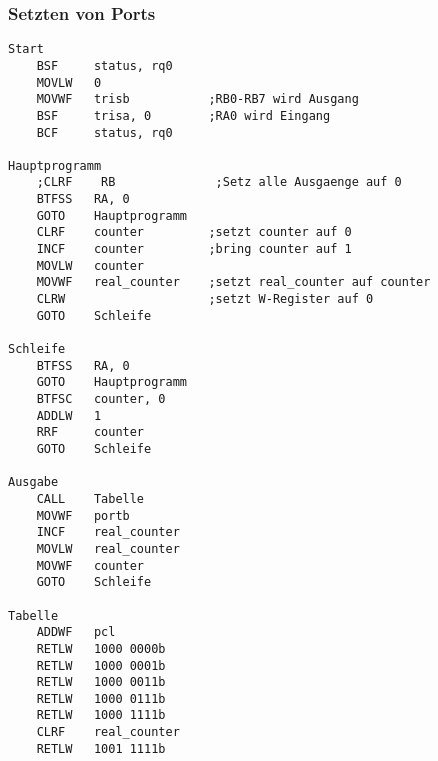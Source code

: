 \subsubsection*{Setzten von Ports}

\begin{lstlisting}[language=avr]
Start
    BSF     status, rq0     
    MOVLW   0
    MOVWF   trisb           ;RB0-RB7 wird Ausgang
    BSF     trisa, 0        ;RA0 wird Eingang
    BCF     status, rq0

Hauptprogramm
    ;CLRF    RB              ;Setz alle Ausgaenge auf 0
    BTFSS   RA, 0           
    GOTO    Hauptprogramm
    CLRF    counter         ;setzt counter auf 0
    INCF    counter         ;bring counter auf 1
    MOVLW   counter
    MOVWF   real_counter    ;setzt real_counter auf counter
    CLRW                    ;setzt W-Register auf 0
    GOTO    Schleife

Schleife
    BTFSS   RA, 0
    GOTO    Hauptprogramm
    BTFSC   counter, 0
    ADDLW   1
    RRF     counter
    GOTO    Schleife

Ausgabe
    CALL    Tabelle
    MOVWF   portb
    INCF    real_counter
    MOVLW   real_counter
    MOVWF   counter
    GOTO    Schleife
    
Tabelle
    ADDWF   pcl
    RETLW   1000 0000b
    RETLW   1000 0001b
    RETLW   1000 0011b
    RETLW   1000 0111b
    RETLW   1000 1111b
    CLRF    real_counter
    RETLW   1001 1111b


\end{lstlisting}
